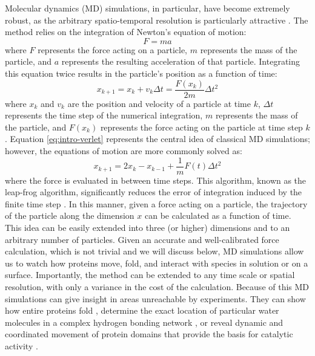 Molecular dynamics (MD) simulations, in particular, have become extremely robust, as the arbitrary spatio-temporal resolution is particularly attractive \cite{Karplus2002}. 
The method relies on the integration of Newton's equation of motion: 
\begin{equation}
    F = m a 
\end{equation}
where $F$ represents the force acting on a particle, $m$ represents the mass of the particle, and $a$ represents the resulting acceleration of that particle. 
Integrating this equation twice results in the particle's position as a function of time: 
\begin{equation}
    x_{k+1} = x_k + v_k \Delta t = \frac{F(x_k)}{2m} \Delta t^2
    \label{eq:intro-verlet}
\end{equation}
where $x_k$ and $v_k$ are the position and velocity of a particle at time $k$,  $\Delta t$ represents the time step of the numerical integration, $m$ represents the mass of the particle, and $F(x_k)$ represents the force acting on the particle at time step $k$. 
Equation \ref{eq:intro-verlet} represents the central idea of classical MD simulations; 
however, the equations of motion are more commonly solved as: 
\begin{equation}
    x_{k+1} = 2 x_k - x_{k-1} + \frac{1}{m} F(t)\Delta t^2
    \label{eq:intro-leapfrog}
\end{equation}
where the force is evaluated in between time steps. 
This algorithm, known as the leap-frog algorithm, significantly reduces the error of integration induced by the finite time step \cite{Hockney1974, Berendsen1986}.
In this manner, given a force acting on a particle, the trajectory of the particle along the dimension $x$ can be calculated as a function of time.
This idea can be easily extended into three (or higher) dimensions and to an arbitrary number of particles. 
Given an accurate and well-calibrated force calculation, which is not trivial and we will discuss below,
MD simulations allow us to watch how proteins move, fold, and interact with species in solution or on a surface. 
Importantly, the method can be extended to any time scale or spatial resolution, with only a variance in the cost of the calculation. 
Because of this MD simulations can give insight in areas unreachable by experiments. 
They can show how entire proteins fold \cite{Cavalli2002, Piana2013}, determine the exact location of particular water molecules in a complex hydrogen bonding network \cite{ContiNibali2014, Jong2017}, or reveal dynamic and coordinated movement of protein domains that provide the basis for catalytic activity \cite{Zeng1999, Ma2000}. 

